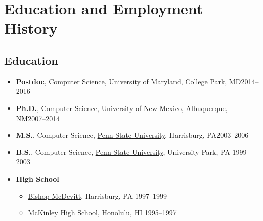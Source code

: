 \documentclass[10pt]{article}
\begin{document}
\section{Education and Employment History}

\subsection{Education}

\begin{itemize}
\item \textbf{Postdoc}, Computer Science,  \href{https://www.umd.edu}{University of Maryland}, College Park, MD\hfill 2014--2016
  
\item \textbf{Ph.D.}, Computer Science,  \href{https://www.unm.edu}{University of New Mexico}, Albuquerque, NM\hfill 2007--2014

\item \textbf{M.S.}, Computer Science,  \href{https://www.hbg.psu.edu}{Penn State University}, Harrisburg, PA\hfill 2003--2006
  
\item \textbf{B.S.}, Computer Science, \href{https://www.psu.edu}{Penn State University}, University Park, PA \hfill 1999--2003
  \vspace{0.1in}
\item \textbf{High School}
  \begin{itemize}
  \item \href{https://www.bishopmcdevitt.org/mcd/}{Bishop McDevitt}, Harrisburg, PA \hfill 1997--1999
  \item \href{https://www.mckinley.k12.hi.us/}{McKinley High School}, Honolulu, HI \hfill 1995--1997  
\end{itemize}
\end{itemize}
\end{document}
